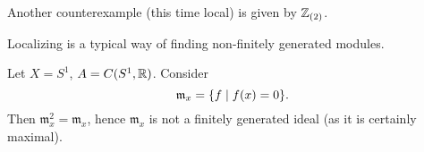 \begin{example}
  Another counterexample (this time local) is given by $\mathbb Z_{(2)}$.
\end{example}

\begin{note}
  Localizing is a typical way of finding non-finitely generated modules.
\end{note}

\begin{example}
  Let $X = S^1$, $A = C(S^1, \mathbb R)$. Consider
  \[ \mathfrak m_x = \{ f \mathrel{|} f(x) = 0 \}. \]
  Then $\mathfrak m_x^2 = \mathfrak m_x$, hence $\mathfrak m_x$ is not a finitely generated ideal (as it is certainly maximal).
\end{example}

